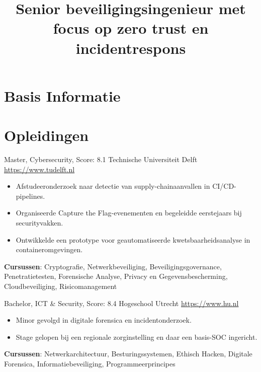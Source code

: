 \documentclass[a4paper, serif, 10pt]{moderncv}
\title{Senior beveiligingsingenieur met focus op zero trust en incidentrespons}
\begin{document}
\maketitle

\section{Basis Informatie}

\section{Opleidingen}

        {Master, Cybersecurity, Score: 8.1}
        {Technische Universiteit Delft}
        {\url{https://www.tudelft.nl}}
        {}
        {\begin{itemize}
\item Afstudeeronderzoek naar detectie van supply-chainaanvallen in CI/CD-pipelines.
\item Organiseerde Capture the Flag-evenementen en begeleidde eerstejaars bij securityvakken.
\item Ontwikkelde een prototype voor geautomatiseerde kwetsbaarheidsanalyse in containeromgevingen.
\end{itemize}
\textbf{Cursussen}: Cryptografie, Netwerkbeveiliging, Beveiligingsgovernance, Penetratietesten, Forensische Analyse, Privacy en Gegevensbescherming, Cloudbeveiliging, Risicomanagement}

        {Bachelor, ICT \& Security, Score: 8.4}
        {Hogeschool Utrecht}
        {\url{https://www.hu.nl}}
        {}
        {\begin{itemize}
\item Minor gevolgd in digitale forensica en incidentonderzoek.
\item Stage gelopen bij een regionale zorginstelling en daar een basis-SOC ingericht.
\end{itemize}
\textbf{Cursussen}: Netwerkarchitectuur, Besturingssystemen, Ethisch Hacken, Digitale Forensica, Informatiebeveiliging, Programmeerprincipes}
\end{document}
